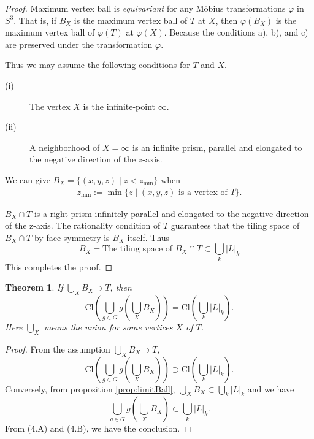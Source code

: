 \documentclass[suppldata, dvipdfmx]{interact}
\theoremstyle{plain}%
\newtheorem{theorem}{Theorem}[section]
\theoremstyle{definition}
\theoremstyle{remark}
\theoremstyle{problemstyle}
\begin{document}
\begin{proof}
 Maximum vertex ball is {\it equivariant} for any M\"obius transformations $\varphi$ in $S^3$. 
That is, if $B_X$ is the maximum vertex ball of $T$ at $X$, then $\varphi(B_X)$ is the maximum vertex ball of $\varphi(T)$ at $\varphi(X)$.
Because the conditions a), b), and c) are preserved under the transformation $\varphi$.

Thus we may assume the following conditions for $T$ and $X$.
 \begin{description}
  \item[(i)] The vertex $X$ is the infinite-point $\infty$.
  \item[(ii)] A neighborhood of $X=\infty$ is an infinite prism, parallel and elongated to the negative direction of the $z$-axis.
 \end{description}
 We can give $B_X = \{(x, y, z) \mid z < z_\text{min}\}$ when
\begin{align*}
z_{\text{min}} := \min\{ z \mid (x, y, z) \text{ is a vertex of } T \}.
\end{align*}

 $B_X \cap T$ is a right prism infinitely parallel and elongated to the negative direction of the z-axis.  The rationality condition of $T$ guarantees that the tiling space of $B_X \cap T$ by face symmetry is $B_X$ itself.  Thus 
\[
B_X = \text{The tiling space of }B_X \cap T \subset \bigcup_k |L|_k
\]
This completes the proof.
\end{proof}

\begin{theorem}
If $\bigcup_{X} B_X \supset T$, then
\[
\text{Cl}\left(\bigcup_{g\in G}g(\bigcup_X {B_X})\right) = \text{Cl}\left(\bigcup_k |L|_k\right).
\]
Here $\bigcup_X$ means the union for some vertices $X$ of $T$.
\end{theorem}

\begin{proof}
  From the assumption $\bigcup_{X} B_X \supset T$, 
\[
\text{Cl}\left(\bigcup_{g\in G} g(\bigcup_X B_X)\right) 
\supset \text{Cl}(\bigcup_{k} |L|_k). \tag{4.A}
\]
 Conversely, from proposition \ref{prop:limitBall},
$\bigcup_X B_X \subset \bigcup_{k} |L|_k$ and we have
\[
\bigcup_{g\in G} g(\bigcup_X B_X)
\subset \bigcup_{k} |L|_k. \tag{4.B}
\]
From (4.A) and (4.B), we have the conclusion.
\end{proof}
\end{document}
